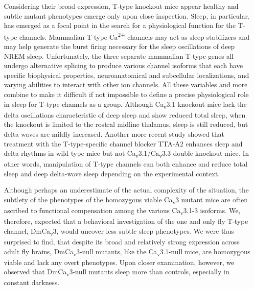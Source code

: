 Considering their broad expression, T-type knockout mice appear healthy and subtle mutant phenotypes emerge only upon close inspection.
Sleep, in particular, has emerged as a focal point in the search for a physiological function for the T-type channels.
Mammalian T-type Ca\textsuperscript{2+} channels may act as sleep stabilizers and may help generate the burst firing necessary for the sleep oscillations of deep NREM sleep.
Unfortunately, the three separate mammalian T-type genes all undergo alternative splicing to produce various channel isoforms that each have specific biophysical properties, neuroanatomical and subcellular localizations, and varying abilities to interact with other ion channels.
All these variables and more combine to make it difficult if not impossible to define a precise physiological role in sleep for T-type channels as a group.
Although Ca\textsubscript{v}3.1 knockout mice lack the delta oscillations characteristic of deep sleep and show reduced total sleep\cite{Lee:2004ey}, when the knockout is limited to the rostral midline thalamus, sleep is still reduced, but delta waves are mildly increased\cite{anderson:2005aa}. Another more recent study showed that treatment with the T-type-specific channel blocker TTA-A2 enhances sleep and delta rhythms in wild type mice but not Ca\textsubscript{v}3.1/Ca\textsubscript{v}3.3 double knockout mice\cite{kraus:2010aa}. In other words, manipulation of T-type channels can both enhance and reduce total sleep and deep delta-wave sleep depending on the experimental context.

Although perhaps an underestimate of the actual complexity of the situation, the subtlety of the phenotypes of the homozygous viable Ca\textsubscript{v}3 mutant mice are often ascribed to functional compensation among the various Ca\textsubscript{v}3.1-3 isoforms\cite{senatore:2012aa}.
We, therefore, expected that a behavioral investigation of the one and only fly T-type channel, DmCa\textsubscript{v}3, would uncover less subtle sleep phenotypes.
We were thus surprised to find, that despite its broad and relatively strong expression across adult fly brains, DmCa\textsubscript{v}3-null mutants, like the Ca\textsubscript{v}3.1-null mice, are homozygous viable and lack any overt phenotypes.
Upon closer examination, however, we observed that DmCa\textsubscript{v}3-null mutants sleep more than controls, especially in constant darkness.

